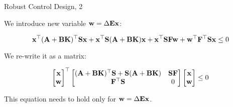 \documentclass{beamer}
\begin{document}
\begin{frame}{Robust Control Design, 2}
	\begin{flushleft}
		
		We introduce new variable $\mathbf{w} = \Delta \mathbf{E} \mathbf{x}$:
		
		\begin{equation*}
			\mathbf{x}^\top(\mathbf{A} + \mathbf{B}\mathbf{K})^\top\mathbf{S}\mathbf{x}
			+
			\mathbf{x}^\top \mathbf{S} (\mathbf{A} + \mathbf{B}\mathbf{K})\mathbf{x}
			+
			\mathbf{x}^\top\mathbf{S}\mathbf{F}\mathbf{w} + \mathbf{w}^\top\mathbf{F}^\top\mathbf{S}\mathbf{x} \leq 0
		\end{equation*}
		
		We re-write it as a matrix:
		
		\begin{equation}
			\label{eq:quad_xw_1}
			\begin{bmatrix}
				\mathbf{x} \\ \mathbf{w}
			\end{bmatrix}^\top
			\begin{bmatrix}
				(\mathbf{A} + \mathbf{B}\mathbf{K})^\top\mathbf{S} + \mathbf{S} (\mathbf{A} + \mathbf{B}\mathbf{K}) & \mathbf{S}\mathbf{F} \\
				\mathbf{F}^\top\mathbf{S} & 0
			\end{bmatrix}
			\begin{bmatrix}
				\mathbf{x} \\ \mathbf{w}
			\end{bmatrix} \leq 0
		\end{equation}		
		
		This equation needs to hold only for $\mathbf{w} = \Delta \mathbf{E} \mathbf{x}$.
		
		
		
	\end{flushleft}
\end{frame}
\end{document}
